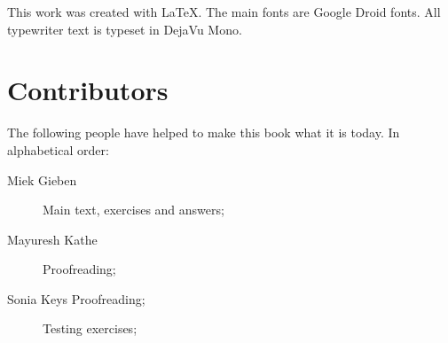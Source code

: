 This work was created with \LaTeX. The main fonts are Google Droid
fonts.
All typewriter text is typeset in DejaVu Mono.

\section{Contributors}
The following people have helped to make this book what it is today.
In alphabetical order:
\begin{description}
\item[Miek Gieben] 
{Main text, exercises and answers;}
\item[Mayuresh Kathe]
{Proofreading;}
\item[Sonia Keys
{Proofreading;}
\item[Makoto Inoue]
{Testing exercises;}
\end{description}
